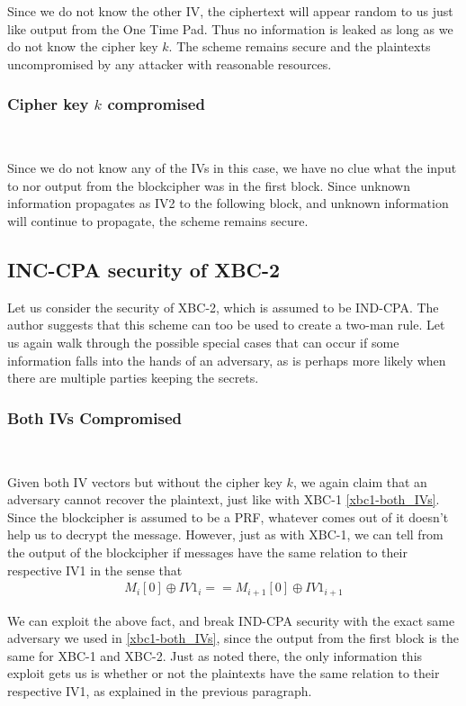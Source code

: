 \documentclass[conference]{IEEEtran}
\begin{document}
Since we do not know the other IV, the ciphertext will appear random to us just like output from the One Time Pad. Thus no information is leaked as long as we do not know the cipher key $k$. The scheme remains secure and the plaintexts uncompromised by any attacker with reasonable resources.

\subsubsection{Cipher key $k$ compromised} \

Since we do not know any of the IVs in this case, we have no clue what the input to nor output from the blockcipher was in the first block. Since unknown information propagates as IV2 to the following block, and unknown information will continue to propagate, the scheme remains secure.

\subsection{INC-CPA security of XBC-2}

Let us consider the security of XBC-2, which is assumed to be IND-CPA. The author suggests that this scheme can too be used to create a two-man rule. Let us again walk through the possible special cases that can occur if some information falls into the hands of an adversary, as is perhaps more likely when there are multiple parties keeping the secrets.

\subsubsection{Both IVs Compromised} \

Given both IV vectors but without the cipher key $k$, we again claim that an adversary cannot recover the plaintext, just like with XBC-1 \ref{xbc1-both_IVs}. Since the blockcipher is assumed to be a PRF, whatever comes out of it doesn't help us to decrypt the message. However, just as with XBC-1, we can tell from the output of the blockcipher if messages have the same relation to their respective IV1 in the sense that
\begin{gather*}
  M_i[0] \oplus IV1_i == M_{i+1}[0] \oplus IV1_{i+1}
\end{gather*}

We can exploit the above fact, and break IND-CPA security with the exact same adversary we used in \ref{xbc1-both_IVs}, since the output from the first block is the same for XBC-1 and XBC-2. Just as noted there, the only information this exploit gets us is whether or not the plaintexts have the same relation to their respective IV1, as explained in the previous paragraph.
\end{document}
